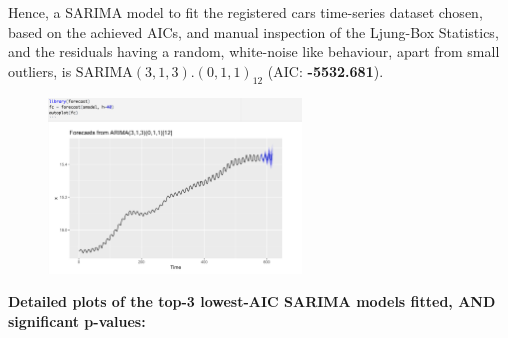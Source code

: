 \documentclass[a4paper,11pt]{article}
\begin{document}
    Hence, a SARIMA model to fit the registered cars time-series dataset chosen, based on the achieved AICs, and manual inspection of the Ljung-Box Statistics, and the residuals having a random, white-noise like behaviour, apart from small outliers, is $\text{SARIMA}(3,1,3).(0,1,1)_{12}$ (AIC: \textbf{-5532.681}). 

    \vspace{-10pt}
    \begin{figure}[H]
        \centering
        \includegraphics[width=0.6\textwidth]{ha-1_files/figure-markdown_strict/forecast.png}
        \label{fig:forecast}
    \end{figure}

    \newpage
    \textbf{Detailed plots of the top-3 lowest-AIC SARIMA models fitted, AND significant p-values:}
\end{document}
